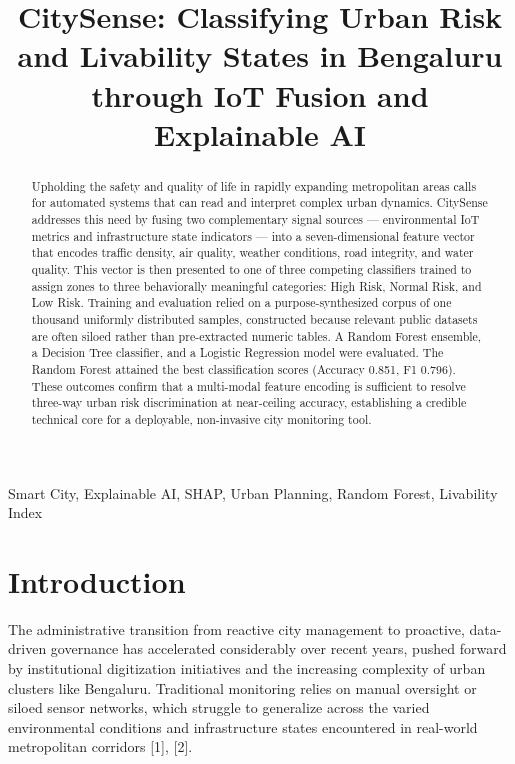\documentclass[conference]{IEEEtran}
\begin{document}
\title{CitySense: Classifying Urban Risk and Livability States in Bengaluru through IoT Fusion and Explainable AI\\
}

\author{
}

\maketitle

\begin{abstract}
Upholding the safety and quality of life in rapidly expanding metropolitan areas calls for automated systems that can read and interpret complex urban dynamics. CitySense addresses this need by fusing two complementary signal sources --- environmental IoT metrics and infrastructure state indicators --- into a seven-dimensional feature vector that encodes traffic density, air quality, weather conditions, road integrity, and water quality. This vector is then presented to one of three competing classifiers trained to assign zones to three behaviorally meaningful categories: High Risk, Normal Risk, and Low Risk. Training and evaluation relied on a purpose-synthesized corpus of one thousand uniformly distributed samples, constructed because relevant public datasets are often siloed rather than pre-extracted numeric tables. A Random Forest ensemble, a Decision Tree classifier, and a Logistic Regression model were evaluated. The Random Forest attained the best classification scores (Accuracy 0.851, F1 0.796). These outcomes confirm that a multi-modal feature encoding is sufficient to resolve three-way urban risk discrimination at near-ceiling accuracy, establishing a credible technical core for a deployable, non-invasive city monitoring tool.
\end{abstract}

\begin{IEEEkeywords}
Smart City, Explainable AI, SHAP, Urban Planning, Random Forest, Livability Index
\end{IEEEkeywords}

\section{Introduction}
The administrative transition from reactive city management to proactive, data-driven governance has accelerated considerably over recent years, pushed forward by institutional digitization initiatives and the increasing complexity of urban clusters like Bengaluru. Traditional monitoring relies on manual oversight or siloed sensor networks, which struggle to generalize across the varied environmental conditions and infrastructure states encountered in real-world metropolitan corridors [1], [2].
\end{document}
